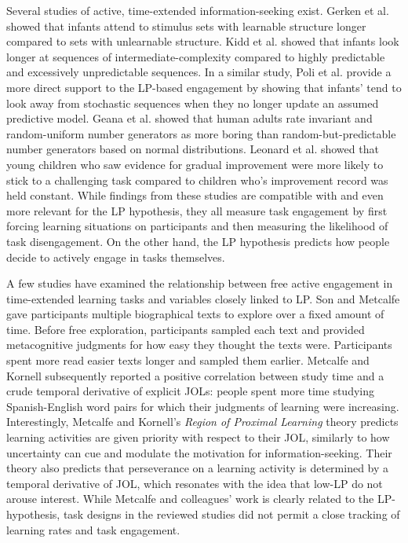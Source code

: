 Several studies of active, time-extended information-seeking exist. Gerken et al. \cite{gerken_infants_2011} showed that infants attend to stimulus sets with learnable structure longer compared to sets with unlearnable structure. Kidd et al. \cite{kidd_goldilocks_2012} showed that infants look longer at sequences of intermediate-complexity compared to highly predictable and excessively unpredictable sequences. In a similar study, Poli et al. \cite{poli_infants_2020} provide a more direct support to the \ac{LP}-based engagement by showing that infants' tend to look away from stochastic sequences when they no longer update an assumed predictive model. Geana et al. \cite{geana_boredom_2016} showed that human adults rate invariant and random-uniform number generators as more boring than random-but-predictable number generators based on normal distributions. Leonard et al. \cite{leonard_young_2021} showed that young children who saw evidence for gradual improvement were more likely to stick to a challenging task compared to children who's improvement record was held constant.  While findings from these studies are compatible with and even more relevant for the \ac{LP} hypothesis, they all measure task engagement by first forcing learning situations on participants and then measuring the likelihood of task disengagement. On the other hand, the \ac{LP} hypothesis predicts how people decide to actively engage in tasks themselves.

A few studies have examined the relationship between free active engagement in time-extended learning tasks and variables closely linked to \ac{LP}. Son and Metcalfe \cite{son_metacognitive_2000} gave participants multiple biographical texts to explore over a fixed amount of time. Before free exploration, participants sampled each text and provided metacognitive judgments for how easy they thought the texts were. Participants spent more read easier texts longer and sampled them earlier. Metcalfe and Kornell \cite{metcalfe_region_2005} subsequently reported a positive correlation between study time and a crude temporal derivative of explicit \acp{JOL}: people spent more time studying Spanish-English word pairs for which their judgments of learning were increasing. Interestingly, Metcalfe and Kornell's \emph{Region of Proximal Learning} theory \cite{metcalfe_region_2005} predicts learning activities are given priority with respect to their \ac{JOL}, similarly to how uncertainty can cue and modulate the motivation for information-seeking. Their theory also predicts that perseverance on a learning activity is determined by a temporal derivative of \ac{JOL}, which resonates with the idea that low-\ac{LP} do not arouse interest. While Metcalfe and colleagues' work is clearly related to the \ac{LP}-hypothesis, task designs in the reviewed studies did not permit a close tracking of learning rates and task engagement.

